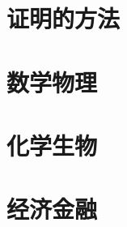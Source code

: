 \documentclass[nofontspec, cn,11pt,dvipsnames,green,cite=numbers,bibstyle=gb7714-2015,T4]{elegantbook}
\begin{document}
\part{证明的方法}



\part{数学物理}








\part{化学生物}




\part{经济金融}






\printbibliography
\end{document}
